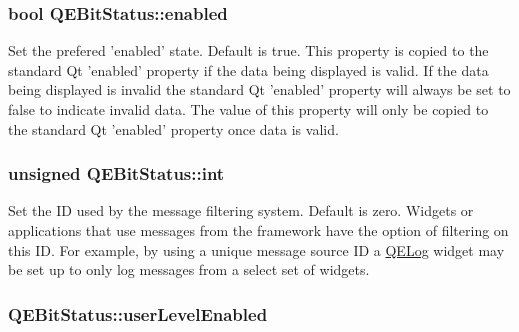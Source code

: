 \hypertarget{classQEBitStatus_a863f17f538fe93d84c5e3f2f315bc0de}{
\subsubsection[{enabled}]{\setlength{\rightskip}{0pt plus 5cm}bool QEBitStatus::enabled}}
\label{classQEBitStatus_a863f17f538fe93d84c5e3f2f315bc0de}
Set the prefered 'enabled' state. Default is true. This property is copied to the standard Qt 'enabled' property if the data being displayed is valid. If the data being displayed is invalid the standard Qt 'enabled' property will always be set to false to indicate invalid data. The value of this property will only be copied to the standard Qt 'enabled' property once data is valid. \hypertarget{classQEBitStatus_a1c3dc5a78cc729b1476148f89018f275}{
\subsubsection[{int}]{\setlength{\rightskip}{0pt plus 5cm}unsigned QEBitStatus::int}}
\label{classQEBitStatus_a1c3dc5a78cc729b1476148f89018f275}
Set the ID used by the message filtering system. Default is zero. Widgets or applications that use messages from the framework have the option of filtering on this ID. For example, by using a unique message source ID a \hyperlink{classQELog}{QELog} widget may be set up to only log messages from a select set of widgets. \hypertarget{classQEBitStatus_aaf35e62560528034f4d2dd67256c5fba}{
\subsubsection[{userLevelEnabled}]{ QEBitStatus::userLevelEnabled}}
\label{classQEBitStatus_aaf35e62560528034f4d2dd67256c5fba}
